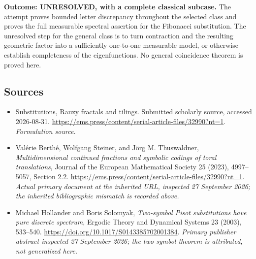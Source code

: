 \documentclass[11pt]{article}
\begin{document}
\textbf{Outcome: UNRESOLVED, with a complete classical subcase.} The
attempt proves bounded letter discrepancy throughout the selected class
and proves the full measurable spectral assertion for the Fibonacci
substitution. The unresolved step for the general class is to turn
contraction and the resulting geometric factor into a sufficiently
one-to-one measurable model, or otherwise establish completeness of the
eigenfunctions. No general coincidence theorem is proved here.

\subsection{Sources}
\begin{itemize}
\item[S1]Substitutions, Rauzy fractals and tilings. Submitted scholarly source, accessed 2026-08-31.
\url{https://ems.press/content/serial-article-files/32990?nt=1}.
\textit{Formulation source.}
\item[E1]Val\'erie Berth\'e, Wolfgang Steiner, and J\"org M. Thuswaldner,
\emph{Multidimensional continued fractions and symbolic codings of toral
translations}, Journal of the European Mathematical Society 25 (2023),
4997--5057, Section 2.2.
\url{https://ems.press/content/serial-article-files/32990?nt=1}.
\textit{Actual primary document at the inherited URL, inspected
27 September 2026; the inherited bibliographic mismatch is recorded above.}
\item[E2]Michael Hollander and Boris Solomyak,
\emph{Two-symbol Pisot substitutions have pure discrete spectrum},
Ergodic Theory and Dynamical Systems 23 (2003), 533--540.
\url{https://doi.org/10.1017/S0143385702001384}.
\textit{Primary publisher abstract inspected 27 September 2026;
the two-symbol theorem is attributed, not generalized here.}
\end{itemize}
\end{document}
